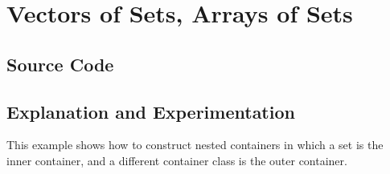 \documentclass{report}
\begin{document}

\pagebreak
\section{Vectors of Sets, Arrays of Sets}

\subsection{Source Code}



\subsection{Explanation and Experimentation}

This example shows how to construct nested containers in which a set is
the inner container, and a different container class is the outer container.
\end{document}
